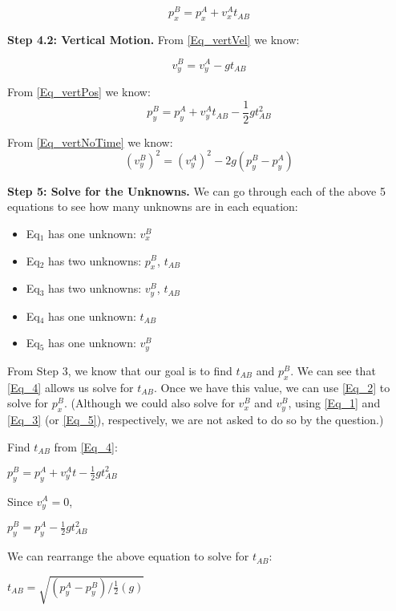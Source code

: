 \documentclass[11pt]{article}
\begin{document}
\begin{equation}
\label{Eq_2}
p_x^B = p_x^A + v_x^A t_{AB}
\end{equation}

\textbf{Step 4.2: Vertical Motion.} From \ref{Eq_vertVel} we know:

\begin{equation}
\label{Eq_3}
v_y^B = v_y^A - g t_{AB}
\end{equation}

From \ref{Eq_vertPos} we know:
\begin{equation}
\label{Eq_4}
p_y^B = p_y^A + v_y^A t_{AB} - \frac{1}{2} g t_{AB}^2
\end{equation}

From \ref{Eq_vertNoTime} we know:
\begin{equation}
\label{Eq_5}
(v_y^B)^2 = (v_y^A)^2 - 2 g ( p_y^B - p_y^A)
\end{equation}

\textbf{Step 5: Solve for the Unknowns.} We can go through each of the above
5 equations to see how many unknowns are in each equation:

\begin{itemize}
\item Eq$_{\text{1}}$ has one unknown: $v_x^B$
\item Eq$_{\text{2}}$ has two unknowns: $p_x^B$, $t_{AB}$
\item Eq$_{\text{3}}$ has two unknowns: $v_y^B$, $t_{AB}$
\item Eq$_{\text{4}}$ has one unknown: $t_{AB}$
\item Eq$_{\text{5}}$ has one unknown: $v_y^B$
\end{itemize}

From Step 3, we know that our goal is to find $t_{AB}$ and $p_x^B$.
We can see that \ref{Eq_4} allows us solve for $t_{AB}$.  Once we have this
value, we can use \ref{Eq_2} to solve for $p_x^B$.  (Although we could also
solve for $v_x^B$ and $v_y^B$, using \ref{Eq_1} and \ref{Eq_3} (or \ref{Eq_5}),
respectively, we are not asked to do so by the question.)

Find $t_{AB}$ from \ref{Eq_4}:

$p^B_y = p^A_y + v^A_y t - \frac{1}{2} g t_{AB}^2$

Since $v^A_y = 0$, 

$p^B_y = p^A_y - \frac{1}{2} g t_{AB}^2$

We can rearrange the above equation to solve for $t_{AB}$: 

$t_{AB} = \sqrt{(p^A_y - p^B_y)/\frac{1}{2}(g)}$
\end{document}
